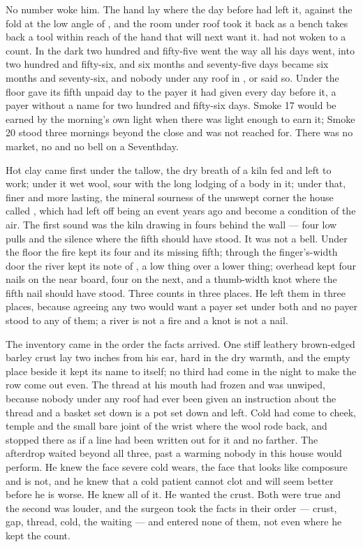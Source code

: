 
No number woke him. The hand lay where the day before had left it, against the fold at the low angle of , and the room under  roof took it back as a bench takes back a tool within reach of the hand that will next want it.  had not woken to a count. In the dark two hundred and fifty-five went the way all his days went, into two hundred and fifty-six, and six months and seventy-five days became six months and seventy-six, and nobody under any roof in ,  or  said so. Under the floor  gave its fifth unpaid day to the payer it had given every day before it, a payer without a name for two hundred and fifty-six days. Smoke 17 would be earned by the morning's own light when there was light enough to earn it; Smoke 20 stood three mornings beyond the close and was not reached for. There was no market, no  and no bell on a Seventhday.

Hot clay came first under the tallow, the dry breath of a kiln fed and left to work; under it wet wool, sour with the long lodging of a body in it; under that, finer and more lasting, the mineral sourness of the unswept corner the house called , which had left off being an event years ago and become a condition of the air. The first sound was the kiln drawing in fours behind the wall --- four low pulls and the silence where the fifth should have stood. It was not a bell. Under the floor the fire kept its four and its missing fifth; through the finger's-width door the river kept its note of , a low thing over a lower thing; overhead  kept four nails on the near board, four on the next, and a thumb-width knot where the fifth nail should have stood. Three counts in three places. He left them in three places, because agreeing any two would want a payer set under both and no payer stood to any of them; a river is not a fire and a knot is not a nail.

The inventory came in the order the facts arrived. One stiff leathery brown-edged barley crust lay two inches from his ear, hard in the dry warmth, and the empty place beside it kept its name to itself; no third had come in the night to make the row come out even. The thread at his mouth had frozen and was unwiped, because nobody under any roof had ever been given an instruction about the thread and a basket set down is a pot set down and left. Cold had come to cheek, temple and the small bare joint of the wrist where the wool rode back, and stopped there as if a line had been written out for it and no farther. The afterdrop waited beyond all three, past a warming nobody in this house would perform. He knew the face severe cold wears, the face that looks like composure and is not, and he knew that a cold patient cannot clot and will seem better before he is worse. He knew all of it. He wanted the crust. Both were true and the second was louder, and the surgeon took the facts in their order --- crust, gap, thread, cold, the waiting --- and entered none of them, not even where he kept the count.

